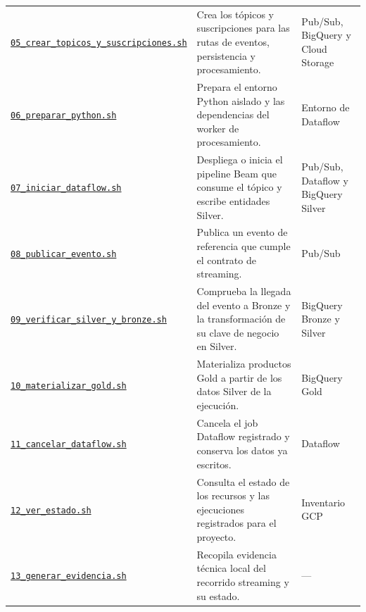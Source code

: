 \documentclass[11pt]{article}
\begin{document}
\begin{longtable}{@{}>{\raggedright\arraybackslash}p{}>{\raggedright\arraybackslash}p{}>{\raggedright\arraybackslash}p{}@{}}
\href{https://github.com/Codenid/lumina-retail-data-platform/blob/main/implementation/automatizacion/scripts05_crear_topicos_y_suscripciones.sh}{\texttt{05\_\allowbreak{}crear\_\allowbreak{}topicos\_\allowbreak{}y\_\allowbreak{}suscripciones.sh}} & Crea los tópicos y suscripciones para las rutas de eventos, persistencia y procesamiento. & Pub/Sub, BigQuery y Cloud Storage \\
\href{https://github.com/Codenid/lumina-retail-data-platform/blob/main/implementation/automatizacion/scripts06_preparar_python.sh}{\texttt{06\_\allowbreak{}preparar\_\allowbreak{}python.sh}} & Prepara el entorno Python aislado y las dependencias del worker de procesamiento. & Entorno de Dataflow \\
\href{https://github.com/Codenid/lumina-retail-data-platform/blob/main/implementation/automatizacion/scripts07_iniciar_dataflow.sh}{\texttt{07\_\allowbreak{}iniciar\_\allowbreak{}dataflow.sh}} & Despliega o inicia el pipeline Beam que consume el tópico y escribe entidades Silver. & Pub/Sub, Dataflow y BigQuery Silver \\
\href{https://github.com/Codenid/lumina-retail-data-platform/blob/main/implementation/automatizacion/scripts08_publicar_evento.sh}{\texttt{08\_\allowbreak{}publicar\_\allowbreak{}evento.sh}} & Publica un evento de referencia que cumple el contrato de streaming. & Pub/Sub \\
\href{https://github.com/Codenid/lumina-retail-data-platform/blob/main/implementation/automatizacion/scripts09_verificar_silver_y_bronze.sh}{\texttt{09\_\allowbreak{}verificar\_\allowbreak{}silver\_\allowbreak{}y\_\allowbreak{}bronze.sh}} & Comprueba la llegada del evento a Bronze y la transformación de su clave de negocio en Silver. & BigQuery Bronze y Silver \\
\href{https://github.com/Codenid/lumina-retail-data-platform/blob/main/implementation/automatizacion/scripts10_materializar_gold.sh}{\texttt{10\_\allowbreak{}materializar\_\allowbreak{}gold.sh}} & Materializa productos Gold a partir de los datos Silver de la ejecución. & BigQuery Gold \\
\href{https://github.com/Codenid/lumina-retail-data-platform/blob/main/implementation/automatizacion/scripts11_cancelar_dataflow.sh}{\texttt{11\_\allowbreak{}cancelar\_\allowbreak{}dataflow.sh}} & Cancela el job Dataflow registrado y conserva los datos ya escritos. & Dataflow \\
\href{https://github.com/Codenid/lumina-retail-data-platform/blob/main/implementation/automatizacion/scripts12_ver_estado.sh}{\texttt{12\_\allowbreak{}ver\_\allowbreak{}estado.sh}} & Consulta el estado de los recursos y las ejecuciones registrados para el proyecto. & Inventario GCP \\
\href{https://github.com/Codenid/lumina-retail-data-platform/blob/main/implementation/automatizacion/scripts13_generar_evidencia.sh}{\texttt{13\_\allowbreak{}generar\_\allowbreak{}evidencia.sh}} & Recopila evidencia técnica local del recorrido streaming y su estado. & — \\
\bottomrule
\end{longtable}
\end{document}
